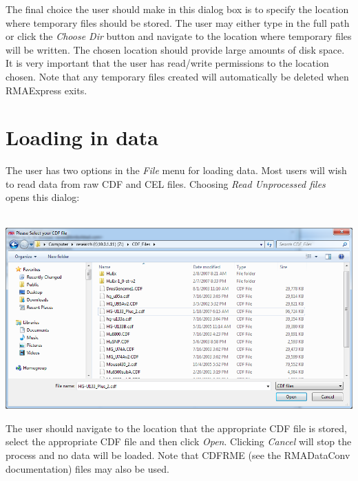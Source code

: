 \documentclass[11pt]{report}
\begin{document}
The final choice the user should make in this dialog box is to specify the location where temporary files should be stored. The user may either type in the full path or click the {\it Choose Dir} button and navigate to the location where temporary files will be written. The chosen location should provide large amounts of disk space. It is very important that the user has read/write permissions to the location chosen. Note that any temporary files created will automatically be deleted when RMAExpress exits.

\section{Loading in data}

The user has two options in the {\it File} menu for loading data. Most users will wish to read data from raw CDF and CEL files. Choosing {\it  Read Unprocessed files} opens this dialog: \\ \\
\begin{center}
\includegraphics[scale=0.5]{openwindow}
\end{center}
The user should navigate to the location that the appropriate CDF file is stored, select the appropriate CDF file and then click {\it Open}. Clicking {\it Cancel} will stop the process and no data will be loaded. Note that CDFRME (see the RMADataConv documentation) files may also be used.
\end{document}
